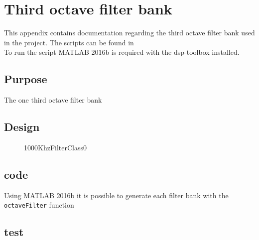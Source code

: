 \section{Third octave filter bank} {\label{sec:OctaveBank}}

This appendix contains documentation regarding the third octave filter bank used in the project. The scripts can be found in 
\\
To run the script MATLAB 2016b is required with the dsp-toolbox installed. 

\subsection{Purpose}

The one third octave filter bank 


\subsection{Design}

\begin{figure}[H]
	\centering
	
	\caption{1000KhzFilterClass0}
	\label{fig:1000KhzFilterClass0}
\end{figure}

\subsection{code}

Using MATLAB 2016b it is possible to generate each filter bank with the \verb|octaveFilter| function


\subsection{test}

